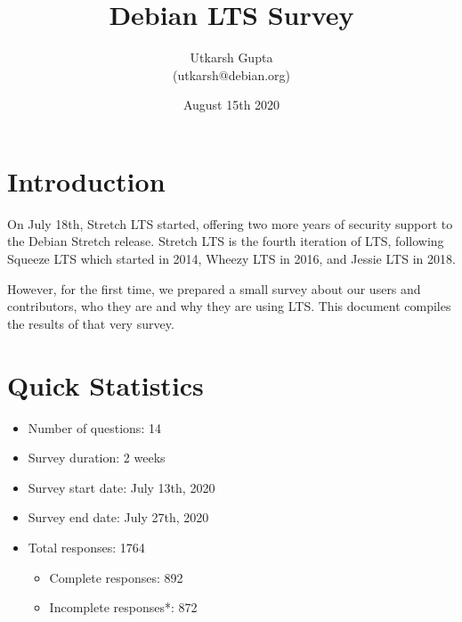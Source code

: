 \documentclass{article}
\title{\textbf{Debian LTS Survey}}
\author{Utkarsh Gupta \\
    \small (utkarsh@debian.org)}
\date{August 15th 2020}
\begin{document}
\maketitle

\vspace{5mm}
\section{Introduction}

On July 18th, Stretch LTS started, offering two more years of security support to the Debian Stretch release. Stretch LTS is the fourth iteration of LTS, following Squeeze LTS which started in 2014, Wheezy LTS in 2016, and Jessie LTS in 2018. \par

\vspace{3mm}
However, for the first time, we prepared a small survey about our users and contributors, who they are and why they are using LTS. This document compiles the results of that very survey.

\vspace{5mm}
\section{Quick Statistics}

\vspace{3mm}
\begin{itemize}
    \item Number of questions: 14
    \item Survey duration: 2 weeks
    \item Survey start date: July 13th, 2020
    \item Survey end date: July 27th, 2020
    \item Total responses: 1764
    \begin{itemize}
        \item Complete responses: 892
        \item Incomplete responses*: 872
    \end{itemize}
\end{itemize}

\end{document}
